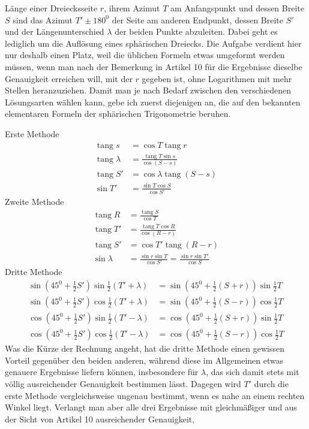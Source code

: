 %
Länge einer Dreiecksseite \(r\), ihrem Azimut \(T\) am Anfangspunkt und dessen Breite \(S\) sind das Azimut \(T'\pm180^0\) der Seite am anderen Endpunkt, dessen Breite \(S'\) und der Längenunterschied \(\lambda\) der beiden Punkte abzuleiten. Dabei geht es lediglich um die Auflösung eines sphärischen Dreiecks. Die Aufgabe verdient hier nur deshalb einen Platz, weil die üblichen Formeln etwas umgeformt werden müssen, wenn man nach der Bemerkung in Artikel 10 für die Ergebnisse dieselbe Genauigkeit erreichen will, mit der \(r\) gegeben ist, ohne Logarithmen mit mehr Stellen heranzuziehen. Damit man je nach Bedarf zwischen den verschiedenen Lösungsarten wählen kann, gebe ich zuerst diejenigen an, die auf den bekannten elementaren Formeln der sphärischen Trigonometrie beruhen.

Erste Methode
\[
\begin{aligned}
\operatorname{tang}s&=\cos T\operatorname{tang}r\\
\operatorname{tang}\lambda&=\frac{\operatorname{tang}T\sin s}{\cos(S-s)}\\
\operatorname{tang}S'&=\cos\lambda\operatorname{tang}(S-s)\\
\sin T'&=\frac{\sin T\cos S}{\cos S'}
\end{aligned}
\]
\indent Zweite Methode
\[
\begin{aligned}
\operatorname{tang}R&=\frac{\operatorname{tang}S}{\cos T}\\
\operatorname{tang}T'&=\frac{\operatorname{tang}T\cos R}{\cos(R-r)}\\
\operatorname{tang}S'&=\cos T'\operatorname{tang}(R-r)\\
\sin\lambda&=\frac{\sin r\sin T}{\cos S'}=\frac{\sin r\sin T'}{\cos S}
\end{aligned}
\]
\indent Dritte Methode
\[
\begin{aligned}
\sin(45^0+\tfrac{1}{2}S')\sin\tfrac{1}{2}(T'+\lambda)&=\sin(45^0+\tfrac{1}{2}(S+r))\sin\tfrac{1}{2}T\\
\sin(45^0+\tfrac{1}{2}S')\cos\tfrac{1}{2}(T'+\lambda)&=\sin(45^0+\tfrac{1}{2}(S-r))\cos\tfrac{1}{2}T\\
\cos(45^0+\tfrac{1}{2}S')\sin\tfrac{1}{2}(T'-\lambda)&=\cos(45^0+\tfrac{1}{2}(S+r))\sin\tfrac{1}{2}T\\
\cos(45^0+\tfrac{1}{2}S')\cos\tfrac{1}{2}(T'-\lambda)&=\cos(45^0+\tfrac{1}{2}(S-r))\cos\tfrac{1}{2}T
\end{aligned}
\]
\indent Was die Kürze der Rechnung angeht, hat die dritte Methode einen gewissen Vorteil gegenüber den beiden anderen, während diese im Allgemeinen etwas genauere Ergebnisse liefern können, insbesondere für \(\lambda\), das sich damit stets mit völlig ausreichender Genauigkeit bestimmen lässt. Dagegen wird \(T'\) durch die erste Methode vergleichsweise ungenau bestimmt, wenn es nahe an einem rechten Winkel liegt. Verlangt man aber alle drei Ergebnisse mit gleichmäßiger und aus der Sicht von Artikel 10 ausreichender Genauigkeit,
